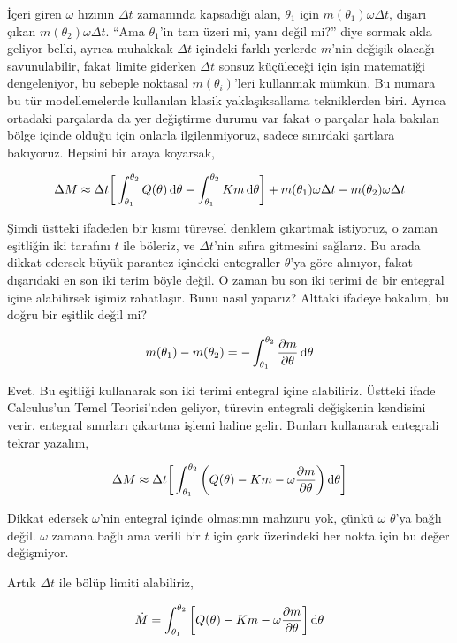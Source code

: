 \documentclass[12pt,fleqn]{article}\usepackage{../../common}
\begin{document}
İçeri giren $\omega$ hızının $\Delta t$ zamanında kapsadığı alan,
$\theta_1$ için $m(\theta_1) \omega \Delta t$, dışarı çıkan
$m(\theta_2) \omega \Delta t$. ``Ama $\theta_1$'in tam üzeri mi, yanı değil
mi?'' diye sormak akla geliyor belki, ayrıca muhakkak $\Delta t$ içindeki
farklı yerlerde $m$'nin değişik olacağı savunulabilir, fakat limite
giderken $\Delta t$ sonsuz küçüleceği için işin matematiği dengeleniyor, bu
sebeple noktasal $m(\theta_i)$'leri kullanmak mümkün. Bu numara bu tür
modellemelerde kullanılan klasik yaklaşıksallama tekniklerden biri. Ayrıca
ortadaki parçalarda da yer değiştirme durumu var fakat o parçalar hala
bakılan bölge içinde olduğu için onlarla ilgilenmiyoruz, sadece sınırdaki
şartlara bakıyoruz.  Hepsini bir araya koyarsak,

$$ 
\Delta M \approx \Delta t \bigg[ 
\int _{\theta_1}^{\theta_2} Q(\theta) \,\mathrm{d}\theta -
\int _{\theta_1}^{\theta_2}  Km \,\mathrm{d}\theta
\bigg] + 
m(\theta_1) \omega \Delta t -
m(\theta_2) \omega \Delta t
$$

Şimdi üstteki ifadeden bir kısmı türevsel denklem çıkartmak istiyoruz, o
zaman eşitliğin iki tarafını $t$ ile böleriz, ve $\Delta t$'nin sıfıra
gitmesini sağlarız. Bu arada dikkat edersek büyük parantez içindeki
entegraller $\theta$'ya göre alınıyor, fakat dışarıdaki en son iki terim
böyle değil. O zaman bu son iki terimi de bir entegral içine alabilirsek
işimiz rahatlaşır. Bunu nasıl yaparız? Alttaki ifadeye bakalım, bu doğru
bir eşitlik değil mi? 

$$ 
m(\theta_1) - m(\theta_2)  = 
-\int _{\theta_1}^{\theta_2} 
\frac{\partial m}{\partial \theta} \,\mathrm{d}\theta
$$

Evet. Bu eşitliği kullanarak son iki terimi entegral içine
alabiliriz. Üstteki ifade Calculus'un Temel Teorisi'nden geliyor, türevin
entegrali değişkenin kendisini verir, entegral sınırları çıkartma işlemi
haline gelir. Bunları kullanarak entegrali tekrar yazalım,

$$ 
\Delta M \approx \Delta t \bigg[ 
\int _{\theta_1}^{\theta_2}  \bigg(
Q(\theta)  -  Km  - \omega \frac{\partial m}{\partial \theta}
\bigg) \,\mathrm{d}\theta
\bigg] 
$$

Dikkat edersek $\omega$'nin entegral içinde olmasının mahzuru yok, çünkü
$\omega$ $\theta$'ya bağlı değil. $\omega$ zamana bağlı ama verili bir $t$
için çark üzerindeki her nokta için bu değer değişmiyor. 

Artık $\Delta t$ ile bölüp limiti alabiliriz, 

$$ 
\dot{M} = \int _{\theta_1}^{\theta_2}  \bigg[
Q(\theta)  -  Km  - \omega \frac{\partial m}{\partial \theta}
\bigg] \,\mathrm{d}\theta
$$
\end{document}

